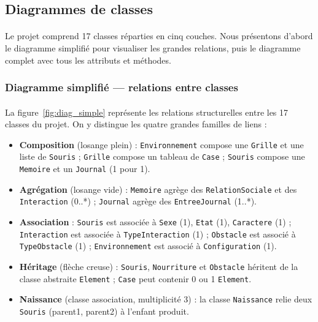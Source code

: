 \bigskip

\subsection{Diagrammes de classes}

\paragraph{} Le projet comprend 17 classes réparties en cinq couches. Nous présentons d'abord le diagramme simplifié pour visualiser les grandes relations, puis le diagramme complet avec tous les attributs et méthodes.

\subsubsection{Diagramme simplifié --- relations entre classes}

\paragraph{} La figure~\ref{fig:diag_simple} représente les relations structurelles entre les 17 classes du projet. On y distingue les quatre grandes familles de liens :

\begin{itemize}
  \item \textbf{Composition} (losange plein) : \texttt{Environnement} compose une \texttt{Grille} et une liste de \texttt{Souris} ; \texttt{Grille} compose un tableau de \texttt{Case} ; \texttt{Souris} compose une \texttt{Memoire} et un \texttt{Journal} (1 pour 1).
  \item \textbf{Agrégation} (losange vide) : \texttt{Memoire} agrège des \texttt{RelationSociale} et des \texttt{Interaction} (0..*) ; \texttt{Journal} agrège des \texttt{EntreeJournal} (1..*).
  \item \textbf{Association} : \texttt{Souris} est associée à \texttt{Sexe} (1), \texttt{Etat} (1), \texttt{Caractere} (1) ; \texttt{Interaction} est associée à \texttt{TypeInteraction} (1) ; \texttt{Obstacle} est associé à \texttt{TypeObstacle} (1) ; \texttt{Environnement} est associé à \texttt{Configuration} (1).
  \item \textbf{Héritage} (flèche creuse) : \texttt{Souris}, \texttt{Nourriture} et \texttt{Obstacle} héritent de la classe abstraite \texttt{Element} ; \texttt{Case} peut contenir 0 ou 1 \texttt{Element}.
  \item \textbf{Naissance} (classe association, multiplicité 3) : la classe \texttt{Naissance} relie deux \texttt{Souris} (parent1, parent2) à l'enfant produit.
\end{itemize}


